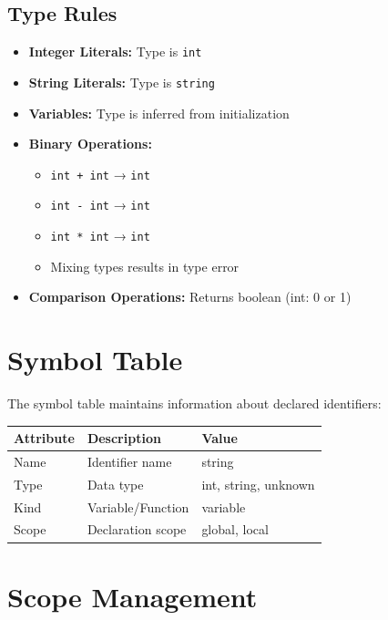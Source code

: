\documentclass[12pt,a4paper]{report}
\begin{document}
\subsection{Type Rules}
\begin{itemize}
    \item \textbf{Integer Literals:} Type is \texttt{int}
    \item \textbf{String Literals:} Type is \texttt{string}
    \item \textbf{Variables:} Type is inferred from initialization
    \item \textbf{Binary Operations:}
    \begin{itemize}
        \item \texttt{int + int} → \texttt{int}
        \item \texttt{int - int} → \texttt{int}
        \item \texttt{int * int} → \texttt{int}
        \item Mixing types results in type error
    \end{itemize}
    \item \textbf{Comparison Operations:} Returns boolean (int: 0 or 1)
\end{itemize}

\section{Symbol Table}

The symbol table maintains information about declared identifiers:

\begin{center}
\begin{tabular}{|l|l|l|}
\hline
\textbf{Attribute} & \textbf{Description} & \textbf{Value} \\
\hline
Name & Identifier name & string \\
\hline
Type & Data type & int, string, unknown \\
\hline
Kind & Variable/Function & variable \\
\hline
Scope & Declaration scope & global, local \\
\hline
\end{tabular}
\end{center}

\section{Scope Management}
\end{document}
